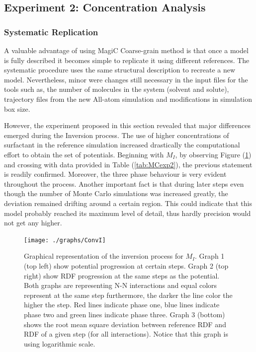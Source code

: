 \documentclass[10pt,a4paper,twoside]{article}
\begin{document}
\subsection{Experiment 2: Concentration Analysis}
\label{subsec:resexp2}

\subsubsection{Systematic Replication}

A valuable advantage of using MagiC Coarse-grain method is that once a model is fully described  it becomes simple to replicate it using different references. The systematic procedure uses the same structural description to recreate a new model. Nevertheless, minor were changes still necessary in the input files for the tools such as, the number of molecules in the system (solvent and solute), trajectory files from the new All-atom simulation and modifications in simulation box size. 

However, the experiment proposed in this section revealed that major differences emerged during the Inversion process. The use of higher concentrations of surfactant in the reference simulation increased drastically the computational effort to obtain the set of potentials. Beginning with $M_{I}$, by observing Figure (\ref{Fig:convI}) and crossing with data provided in Table (\ref{tab:MCexp2}), the previous statement is readily confirmed. Moreover, the three phase behaviour is very evident throughout the process. Another important fact is that during later steps even though the number of Monte Carlo simulations was increased greatly, the deviation remained drifting around a certain region. This could indicate that this model probably reached its maximum level of detail, thus hardly precision would not get any higher.

\begin{figure}[H]
  \begin{center}
	\texttt{[image: ./graphs/ConvI]}
	\caption{\small{Graphical representation of the inversion process for $M_I$. Graph 1 (top left) show potential progression at certain steps. Graph 2 (top right) show RDF progression at the same steps as the potential. Both graphs are representing N-N interactions and equal colors represent at the same step furthermore, the darker the line color the higher the step. Red lines indicate phase one, blue lines indicate phase two and green lines indicate phase three.  Graph 3 (bottom) shows the root mean square deviation between reference RDF and RDF of a given step (for all interactions). Notice that this graph is using logarithmic scale.}}
	\label{Fig:convI}
  \end{center}
\end{figure} 
\end{document}
